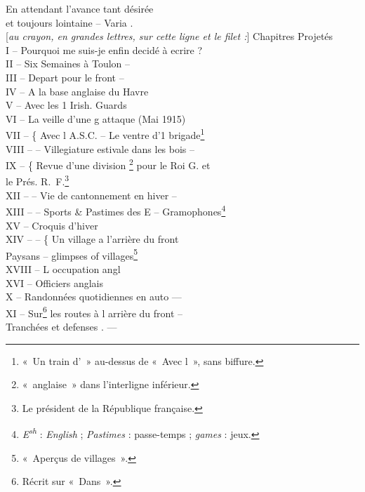 \begin{LJlettre}
 \quad En attendant l'avance tant désirée \hfill {}\\
et toujours lointaine – Varia .\\
{}[\textit{au crayon, en grandes lettres, sur cette ligne et le filet :}] Chapitres Projetés\\
I – Pourquoi me suis-je enfin decidé à ecrire ?\\
II – Six Semaines  à Toulon –\label{annexe:doc6-ii}\\
III – Depart pour le front –\label{annexe:doc6-iii}\\
IV – A la base anglaise du Havre\\
V – Avec les 1 Irish. Guards\label{annexe:doc6-v}\\
VI – La veille d'une g attaque (Mai 1915)\label{annexe:doc6-vi}\\
VII – \{  Avec l A.S.C. – Le ventre d'1 brigade\footnote{«~Un train d'~» au-dessus de «~Avec l~», sans biffure.}\label{annexe:doc6-vii}\\
VIII – – Villegiature estivale dans les bois –\\
IX – \label{annexe:doc6-ix}\{ Revue d'une division \footnote{«~anglaise~» dans l'interligne inférieur.} pour le Roi G. et\\
\hspace*{3em}le Prés. R.~F.\footnote{Le président de la République française.}\\
XII – – Vie de cantonnement en hiver – \label{annexe:doc6-xii}\\
XIII – – Sports  \& Pastimes des E – Gramophones\footnote{\textit{E\textsuperscript{sh}} : \textit{English} ; \textit{Pastimes} : passe-temps ; \textit{games} : jeux.}\\
XV – Croquis d'hiver\\
XIV – – \{ Un village a l'arrière du front\\
\hspace*{3em}Paysans – glimpses of villages\footnote{«~Aperçus de villages~».}\\
XVIII – L occupation angl\label{annexe:doc6-xviii}\\
XVI – Officiers anglais\label{annexe:doc6-xvi}\\
X – Randonnées quotidiennes en auto —\label{annexe:doc6-x}\\
XI – Sur\footnote{Récrit sur «~Dans~».} les routes à l arrière du front –\\
\hspace*{3em}Tranchées et defenses . —


\end{LJlettre}
